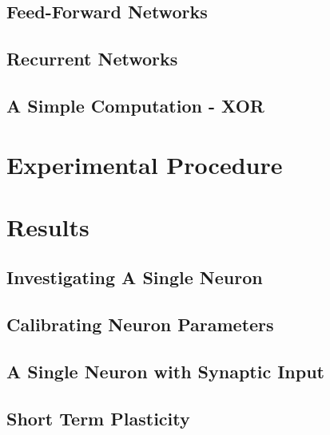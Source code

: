 \documentclass[10pt,a4paper]{article}
\begin{document}
\subsection{Feed-Forward Networks}

\subsection{Recurrent Networks}

\subsection{A Simple Computation - XOR}
\section{Experimental Procedure}

\section{Results}

\subsection{Investigating A Single Neuron}

\subsection{Calibrating Neuron Parameters}

\subsection{A Single Neuron with Synaptic Input}

\subsection{Short Term Plasticity}
\end{document}
